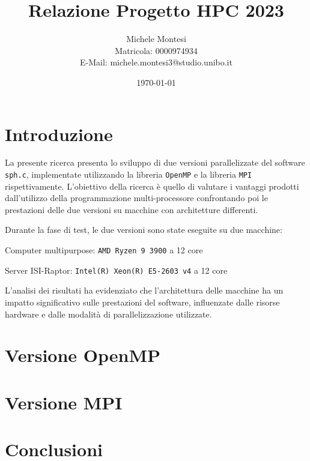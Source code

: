 \documentclass[a4paper, 12pt]{report}
\title{Relazione Progetto HPC 2023}
\author{Michele Montesi \\
        Matricola: 0000974934 \\
        E-Mail: michele.montesi3@studio.unibo.it}
\date{\today}
\newenvironment{packed_enum}{
\begin{enumerate}
        \setlength{\itemsep}{1pt}
        \setlength{\parskip}{0pt}
        \setlength{\parsep}{0pt}
}{\end{enumerate}}
\begin{document}
\maketitle
\tableofcontents

\chapter{Introduzione}
\begin{sloppypar}
La presente ricerca presenta lo sviluppo di due versioni parallelizzate del software \texttt{sph.c}, 
implementate utilizzando la libreria \texttt{OpenMP} e la libreria \texttt{MPI} rispettivamente. 
L'obiettivo della ricerca è quello di valutare i vantaggi prodotti dall'utilizzo della programmazione multi-processore 
confrontando poi le prestazioni delle due versioni su macchine con architetture differenti.
\end{sloppypar}

\bigskip

\begin{sloppypar}
\noindent
Durante la fase di test, le due versioni sono state eseguite su due macchine:
\begin{packed_enum}
  \item Computer multipurpose: \texttt{AMD Ryzen 9 3900} a 12 core
  \item Server ISI-Raptor: \texttt{Intel(R) Xeon(R) E5-2603 v4} a 12 core
\end{packed_enum} 
L'analisi dei risultati ha evidenziato che l'architettura delle macchine ha un impatto significativo sulle 
prestazioni del software, influenzate dalle risorse hardware e dalle modalità di parallelizzazione utilizzate.
\end{sloppypar}

\chapter{Versione OpenMP}

\chapter{Versione MPI}

\chapter{Conclusioni}
\end{document}
